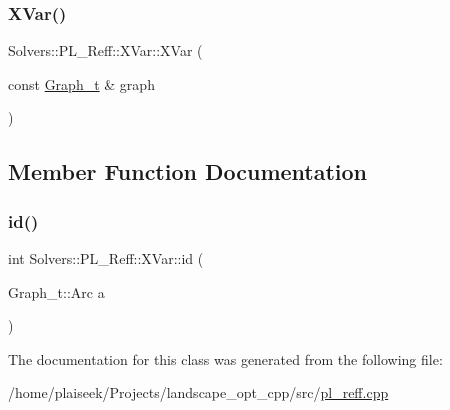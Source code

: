 \subsubsection{\texorpdfstring{X\+Var()}{XVar()}}
{\footnotesize\ttfamily Solvers\+::\+P\+L\+\_\+\+Reff\+::\+X\+Var\+::\+X\+Var (\begin{DoxyParamCaption}\item[{const \hyperlink{pl__reff_8cpp_a65aea14f39d53b24df9910d54216d620}{Graph\+\_\+t} \&}]{graph }\end{DoxyParamCaption})\hspace{0.3cm}{\ttfamily [inline]}}



\subsection{Member Function Documentation}
\mbox{\label{class_solvers_1_1_p_l___reff_1_1_x_var_a28ce9ea0dfd74c1f04feaa90809bcd66}} 
\subsubsection{\texorpdfstring{id()}{id()}}
{\footnotesize\ttfamily int Solvers\+::\+P\+L\+\_\+\+Reff\+::\+X\+Var\+::id (\begin{DoxyParamCaption}\item[{Graph\+\_\+t\+::\+Arc}]{a }\end{DoxyParamCaption})\hspace{0.3cm}{\ttfamily [inline]}}



The documentation for this class was generated from the following file\+:\begin{DoxyCompactItemize}
\item 
/home/plaiseek/\+Projects/landscape\+\_\+opt\+\_\+cpp/src/\hyperlink{pl__reff_8cpp}{pl\+\_\+reff.\+cpp}\end{DoxyCompactItemize}
